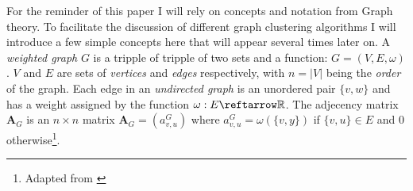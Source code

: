 For the reminder of this paper I will rely on concepts and notation from 
Graph theory. To facilitate the discussion of different graph clustering 
algorithms I will introduce a few simple concepts here that will appear 
several times later on. A \emph{weighted graph} $G$ is a tripple of 
tripple of two sets and a function: $G = (V, E, \omega)$. $V$ and $E$ 
are sets of \emph{vertices} and \emph{edges} respectively, with $n = 
|V|$ being the \emph{order} of the graph. Each edge in an 
\emph{undirected graph} is an unordered pair $\{v, w\}$ and has a weight 
assigned by the function $\omega : E \reftarrow \mathbb{R}$. The 
adjecency matrix $\textbf{A}_G$ is an $n \times n$ matrix $\textbf{A}_G 
= (a_{v,u}^G)$ where $a_{v,u}^G = \omega(\{v,y\})$ if $\{v,u\} \in E$ 
and $0$ otherwise\footnote{Adapted from \cite{shaeffer2007}}.


